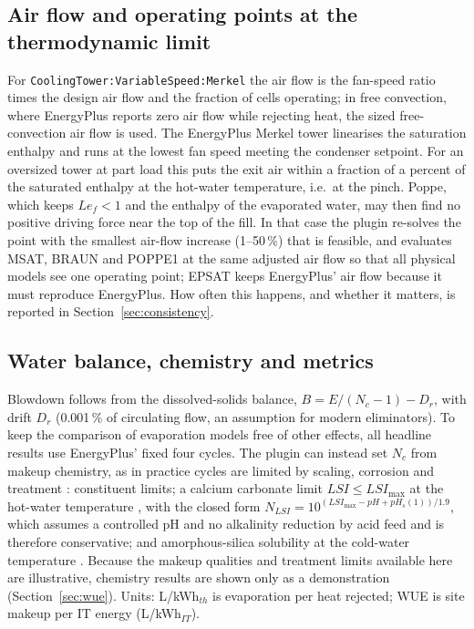 \documentclass[preprint,12pt,authoryear]{elsarticle}
\begin{document}
\subsection{Air flow and operating points at the thermodynamic limit}\label{sec:airflow}
For \texttt{CoolingTower:VariableSpeed:Merkel} the air flow is the fan-speed ratio times the design air flow and the
fraction of cells operating; in free convection, where EnergyPlus reports zero air flow while rejecting heat, the sized
free-convection air flow is used. The EnergyPlus Merkel tower linearises the saturation enthalpy and runs at the lowest
fan speed meeting the condenser setpoint. For an oversized tower at part load this puts the exit air within a fraction
of a percent of the saturated enthalpy at the hot-water temperature, i.e.\ at the pinch. Poppe, which keeps $Le_f<1$ and
the enthalpy of the evaporated water, may then find no positive driving force near the top of the fill. In that case
the plugin re-solves the point with the smallest air-flow increase (1--50\,\%) that is feasible, and evaluates MSAT,
BRAUN and POPPE1 at the same adjusted air flow so that all physical models see one operating point; EPSAT keeps EnergyPlus'
air flow because it must reproduce EnergyPlus. How often this happens, and whether it matters, is reported in
Section~\ref{sec:consistency}.

\subsection{Water balance, chemistry and metrics}\label{sec:chem}
Blowdown follows from the dissolved-solids balance, $B = E/(N_c-1) - D_r$, with drift $D_r$ (0.001\,\% of circulating
flow, an assumption for modern eliminators). To keep the comparison of evaporation models free of other effects, all
headline results use EnergyPlus' fixed four cycles. The plugin can instead set $N_c$ from makeup chemistry, as in
practice cycles are limited by scaling, corrosion and treatment \citep{li2011control,altman2012membrane,pan2018cooling,soliman2022treatment}:
constituent limits; a calcium carbonate limit $LSI\le LSI_{\max}$ at the hot-water temperature
\citep{langelier1936analytical}, with the closed form $N_{LSI}=10^{(LSI_{\max}-pH+pH_s(1))/1.9}$, which assumes a
controlled pH and no alkalinity reduction by acid feed and is therefore conservative; and amorphous-silica solubility
at the cold-water temperature \citep{fournier1977chemical}. Because the makeup qualities and treatment limits available
here are illustrative, chemistry results are shown only as a demonstration (Section~\ref{sec:wue}). Units: L/kWh$_{th}$ is
evaporation per heat rejected; WUE is site makeup per IT energy (L/kWh$_{IT}$).
\end{document}
